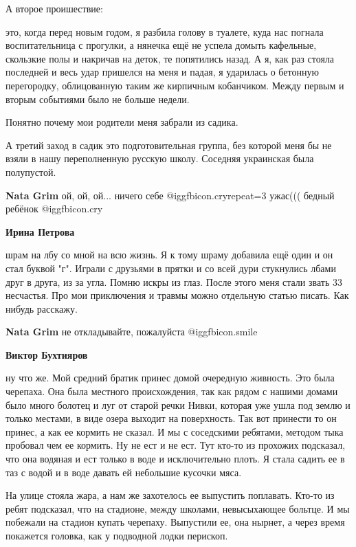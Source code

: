 \begin{itemize}
А второе проишествие:

это, когда перед новым годом, я разбила голову в туалете, куда нас погнала
воспитательница с прогулки, а нянечка ещё не успела домыть кафельные, скользкие
полы и накричав на деток, те попятились назад. А я, как раз стояла последней и
весь удар пришелся на меня и падая, я ударилась о бетонную перегородку,
облицованную таким же кирпичным кобанчиком. Между первым и вторым событиями
было не больше недели.

Понятно почему мои родители меня забрали из садика.

А третий заход в садик это подготовительная группа, без которой меня бы не
взяли в нашу переполненную русскую школу. Соседняя украинская была полупустой.

\begin{itemize} %
\textbf{Nata Grim} ой, ой, ой... ничего себе @igg{fbicon.cry}{repeat=3}  ужас((( бедный ребёнок  @igg{fbicon.cry} 

\begin{itemize} %
\textbf{Ирина Петрова} 

шрам на лбу со мной на всю жизнь. Я к тому шраму добавила ещё один и он стал
буквой "г". Играли с друзьями в прятки и со всей дури стукнулись лбами друг в
друга, из за угла. Помню искры из глаз. После этого меня стали звать 33
несчастья. Про мои приключения и травмы можно отдельную статью писать. Как
нибудь расскажу.

\textbf{Nata Grim} не откладывайте, пожалуйста  @igg{fbicon.smile} 

\textbf{Виктор Бухтияров} 

ну что же. Мой средний братик принес домой очередную живность. Это была
черепаха. Она была местного происхождения, так как рядом с нашими домами было
много болотец и луг от старой речки Нивки, которая уже ушла под землю и только
местами, в виде озера выходит на поверхность. Так вот принести то он принес, а
как ее кормить не сказал. И мы с соседскими ребятами, методом тыка пробовал чем
ее кормить. Ну не ест и не ест. Тут кто-то из прохожих подсказал, что она
водяная и ест только в воде и исключительно плоть. Я стала садить ее в таз с
водой и в воде давать ей небольшие кусочки мяса.

На улице стояла жара, а нам же захотелось ее выпустить поплавать. Кто-то из
ребят подсказал, что на стадионе, между школами, невысыхающее больтце. И мы
побежали на стадион купать черепаху. Выпустили ее, она нырнет, а через время
покажется головка, как у подводной лодки перископ.


\end{itemize}
\end{itemize}
\end{itemize}
